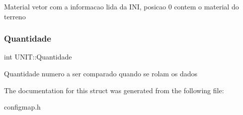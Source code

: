 Material vetor com a informacao lida da I\+NI, posicao 0 contem o material do terreno \mbox{\label{struct_u_n_i_t_a1878ea7b1f85a363ffd2ceeefff6e1ee}} 
\subsubsection{\texorpdfstring{Quantidade}{Quantidade}}
{\footnotesize\ttfamily int U\+N\+I\+T\+::\+Quantidade}

Quantidade numero a ser comparado quando se rolam os dados 

The documentation for this struct was generated from the following file\+:\begin{DoxyCompactItemize}
\item 
configmap.\+h\end{DoxyCompactItemize}
